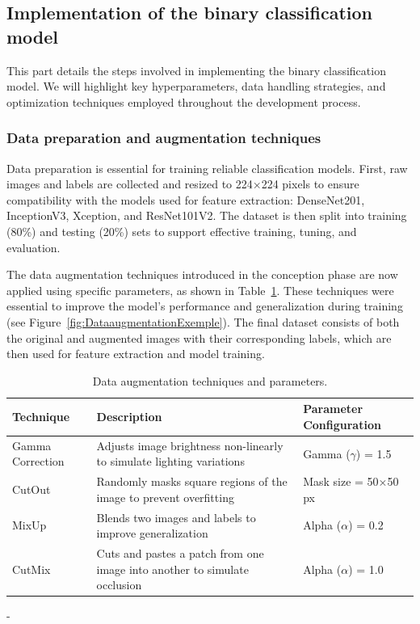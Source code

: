 \subsection{Implementation of the binary classification model}
This part details the steps involved in implementing the binary classification model. We will highlight key hyperparameters, data handling strategies, and optimization techniques employed throughout the development process.

\subsubsection{Data preparation and augmentation techniques}
Data preparation is essential for training reliable classification models. First, raw images and labels are collected and resized to 224×224 pixels to ensure compatibility with the models used for feature extraction: DenseNet201, InceptionV3, Xception, and ResNet101V2. The dataset is then split into training (80\%) and testing (20\%) sets to support effective training, tuning, and evaluation.


The data augmentation techniques introduced in the conception phase are now applied using specific parameters, as shown in Table~\ref{tab:DataAugmentation}. These techniques were essential to improve the model’s performance and generalization during training (see Figure~\ref{fig:DataaugmentationExemple}). The final dataset consists of both the original and augmented images with their corresponding labels, which are then used for feature extraction and model training.
\begin{table}[h]
    \caption{Data augmentation techniques and parameters.}
    \centering
    \renewcommand{\arraystretch}{1.5}
    \setlength{\tabcolsep}{10pt}
    \begin{tabular}{|p{3.5cm}|p{6.5cm}|p{4cm}|}
        \hline
        \textbf{Technique} & \textbf{Description} & \textbf{Parameter Configuration} \\ \hline
        Gamma Correction & Adjusts image brightness non-linearly to simulate lighting variations & Gamma ($\gamma$) = 1.5 \\ \hline
        CutOut & Randomly masks square regions of the image to prevent overfitting & Mask size = 50×50 px \\ \hline
        MixUp & Blends two images and labels to improve generalization & Alpha ($\alpha$) = 0.2 \\ \hline
        CutMix & Cuts and pastes a patch from one image into another to simulate occlusion & Alpha ($\alpha$) = 1.0 \\ \hline
    \end{tabular}-
    \label{tab:DataAugmentation}
\end{table}


